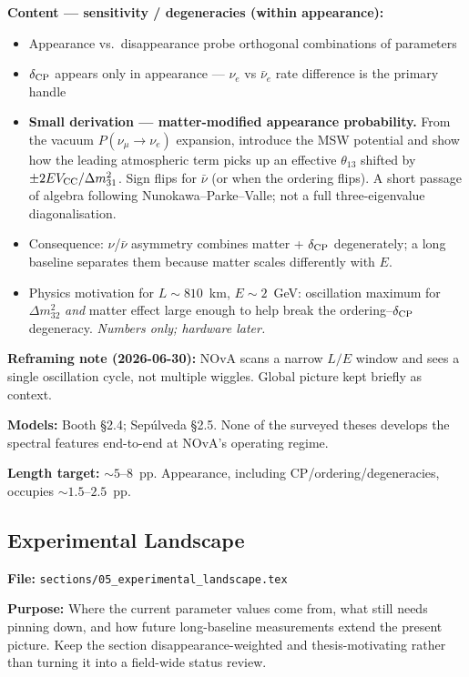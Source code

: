 \documentclass[11pt]{article}
\begin{document}
\textbf{Content --- sensitivity / degeneracies (within appearance):}
\begin{itemize}
    \item Appearance vs.\ disappearance probe orthogonal combinations of parameters
    \item $\delta_{\rm CP}$ appears only in appearance --- $\nu_{e}$ vs $\bar\nu_{e}$ rate
    difference is the primary handle
    \item \textbf{Small derivation --- matter-modified appearance probability.}
    From the vacuum $P(\nu_\mu \to \nu_e)$ expansion, introduce the MSW potential and show how
    the leading atmospheric term picks up an effective $\theta_{13}$ shifted by
    $\pm 2 E V_{\rm CC} / \Delta m^{2}_{31}$. Sign flips for $\bar\nu$ (or when the ordering
    flips). A short passage of algebra following Nunokawa--Parke--Valle; not a full
    three-eigenvalue diagonalisation.
    \item Consequence: $\nu$/$\bar\nu$ asymmetry combines matter + $\delta_{\rm CP}$
    degenerately; a long baseline separates them because matter scales differently with $E$.
    \item Physics motivation for $L \sim 810$~km, $E \sim 2$~GeV: oscillation maximum for
    $\Delta m^{2}_{32}$ \emph{and} matter effect large enough to help break the
    ordering--$\delta_{\rm CP}$ degeneracy. \emph{Numbers only; hardware later.}
\end{itemize}

\textbf{Reframing note (2026-06-30):} NOvA scans a narrow $L/E$ window and sees a single
oscillation cycle, not multiple wiggles. Global picture kept briefly as context.

\textbf{Models:} Booth \S2.4; Sep\'ulveda \S2.5. None of the surveyed theses develops the
spectral features end-to-end at NOvA's operating regime.

\textbf{Length target:} $\sim 5$--$8$~pp. Appearance, including CP/ordering/degeneracies,
occupies $\sim 1.5$--$2.5$~pp.

\subsection{Experimental Landscape}
\label{plan:landscape}

\textbf{File:} \texttt{sections/05\_experimental\_landscape.tex}

\textbf{Purpose:} Where the current parameter values come from, what still needs pinning down,
and how future long-baseline measurements extend the present picture. Keep the section
disappearance-weighted and thesis-motivating rather than turning it into a field-wide status
review.
\end{document}
